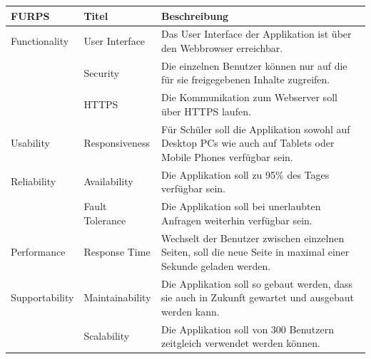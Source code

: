 \begin{table}[h]
	\centering
	\begin{tabu} to 0.9\textwidth {l l X}
	\toprule
	FURPS & Titel & Beschreibung \\ 
	\midrule
	Functionality & User Interface & Das User Interface der Applikation ist über den Webbrowser erreichbar. \\ 
	& Security & Die einzelnen Benutzer können nur auf die für sie freigegebenen Inhalte zugreifen. \\
	& HTTPS & Die Kommunikation zum Webserver soll über HTTPS laufen. \\
	\midrule
	Usability & Responsiveness & Für Schüler soll die Applikation sowohl auf Desktop PCs wie auch auf Tablets oder Mobile Phones verfügbar sein. \\
	\midrule
	Reliability & Availability & Die Applikation soll zu 95\% des Tages verfügbar sein. \\
	 & Fault Tolerance & Die Applikation soll bei unerlaubten Anfragen weiterhin verfügbar sein. \\
	\midrule
	Performance & Response Time & Wechselt der Benutzer zwischen einzelnen Seiten, soll die neue Seite in maximal einer Sekunde geladen werden.\\
	\midrule
	Supportability & Maintainability & Die Applikation soll so gebaut werden, dass sie auch in Zukunft gewartet und ausgebaut werden kann. \\
	 & Scalability & Die Applikation soll von 300 Benutzern zeitgleich verwendet werden können. \\
	\bottomrule
	\end{tabu}
	\label{nfr}
\end{table}

